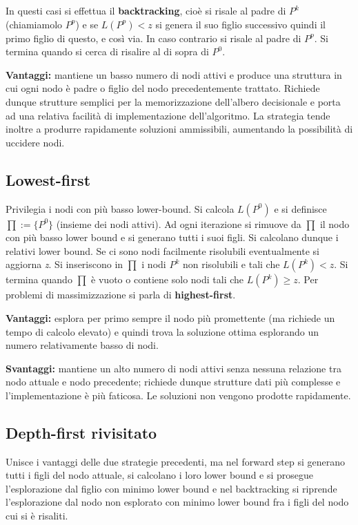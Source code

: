 \documentclass[11pt]{book}
\begin{document}
In questi casi si effettua il {\bf backtracking}, cio\`e si risale al
padre di $P^k$ (chiamiamolo $P^p$) e se $L(P^p)<z$ si genera il suo
figlio successivo quindi il primo figlio di questo, e cos\`i via. In
caso contrario si risale al padre di $P^p$. Si termina quando si cerca
di risalire al di sopra di $P^0$.

{\bf Vantaggi:} mantiene un basso numero di nodi attivi e produce una
struttura in cui ogni nodo \`e padre o figlio del nodo precedentemente
trattato. Richiede dunque strutture semplici per la memorizzazione
dell'albero decisionale e porta ad una relativa facilit\`a di
implementazione dell'algoritmo. La strategia tende inoltre a produrre
rapidamente soluzioni ammissibili, aumentando la possibilit\`a di
uccidere nodi.

\subsection{Lowest-first}

Privilegia i nodi con pi\`u basso lower-bound. Si calcola $L(P^0)$ e
si definisce $\prod := \{ P^0 \}$ (insieme dei nodi attivi). Ad ogni
iterazione si rimuove da $\prod$ il nodo con pi\`u basso lower bound e
si generano tutti i suoi figli. Si calcolano dunque i relativi lower
bound. Se ci sono nodi facilmente risolubili eventualmente si aggiorna
{\em z}. Si inseriscono in $\prod$ i nodi $P^k$ non risolubili e tali
che $L(P^k)<z$. Si termina quando $\prod$ \`e vuoto o contiene solo
nodi tali che $L(P^k)\geq z$. Per problemi di massimizzazione si parla
di {\bf highest-first}.

{\bf Vantaggi:} esplora per primo sempre il nodo pi\`u promettente (ma
richiede un tempo di calcolo elevato) e quindi trova la soluzione
ottima esplorando un numero relativamente basso di nodi.

{\bf Svantaggi:} mantiene un alto numero di nodi attivi senza nessuna
relazione tra nodo attuale e nodo precedente; richiede dunque
strutture dati pi\`u complesse e l'implementazione \`e pi\`u
faticosa. Le soluzioni non vengono prodotte rapidamente.

\subsection{Depth-first rivisitato}

Unisce i vantaggi delle due strategie precedenti, ma nel forward step
si generano tutti i figli del nodo attuale, si calcolano i loro lower
bound e si prosegue l'esplorazione dal figlio con minimo lower bound e
nel backtracking si riprende l'esplorazione dal nodo non esplorato con
minimo lower bound fra i figli del nodo cui si \`e risaliti.
\end{document}
